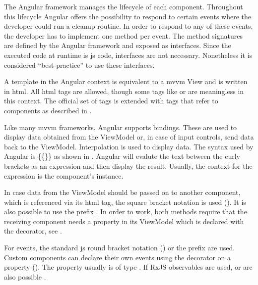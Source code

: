 The Angular framework manages the lifecycle of each component. Throughout this lifecycle Angular offers the possibility to respond to certain events \zB {} where the developer could run a cleanup routine. In order to respond to any of these events, the developer has to implement one method per event. The method signatures are defined by the Angular framework and exposed as interfaces. Since the executed code at runtime is \gls{js} code, interfaces are not necessary. Nonetheless it is considered \enquote{best-practice} to use these interfaces.

A template in the Angular context is equivalent to a \gls{mvvm} View and is written in \gls{html}. All \gls{html} tags are allowed, though some tags like  or  are meaningless in this context. The official set of tags is extended with tags that refer to components as described in .

Like many \gls{mvvm} frameworks, Angular supports bindings. These are used to display data obtained from the ViewModel or, in case of input controls, send data back to the ViewModel. Interpolation is used to display data. The syntax used by Angular is \{\{\}\} as shown in . Angular will evalute the text between the curly brackets as an expression and then display the result. Usually, the context for the expression is the component's instance.


In case data from the ViewModel should be passed on to another component, which is referenced via its \gls{html} tag, the square bracket notation is used (). It is also possible to use the  prefix \zB {}. In order to work, both methods require that the receiving component needs a property in its ViewModel which is declared with the  decorator, see .

For events, the standard \gls{js} round bracket notation () or the  prefix \zB {} are used. Custom components can declare their own events using the  decorator on a property (). The property usually is of type . If RxJS observables are used,  or  are also possible \cite{rxjs}.

